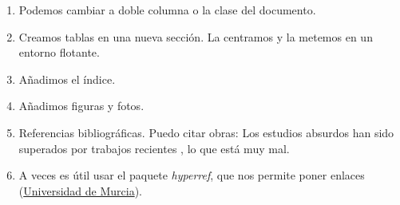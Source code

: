 \documentclass[a4,12pt]{article}
\begin{document}
\begin{enumerate}
\item Podemos cambiar a doble columna o la clase del documento.

\item Creamos tablas en una nueva sección. La centramos y la metemos en un entorno flotante.

\item Añadimos el índice.

\item Añadimos figuras y fotos.

\item Referencias bibliográficas. Puedo citar obras: Los estudios absurdos \cite{gomez98} han sido superados por trabajos recientes \cite{fernandez08}, lo que está muy mal.

\item A veces es útil usar el paquete \emph{hyperref}, que nos permite poner enlaces (\href{http://www.um.es}{Universidad de Murcia}).

\end{enumerate}


\end{document}
